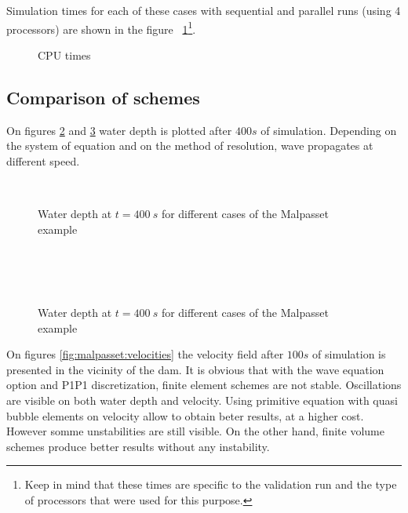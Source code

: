 Simulation times for each of these cases with sequential and parallel runs (using 4 processors) are shown in the figure ~\ref{fig:malpasset:cputime}\footnote{Keep in mind that these times
are specific to the validation run and the type of processors that were used for this purpose.}.

\begin{figure}[h!]
  \centering
  \caption{CPU times}\label{fig:malpasset:cputime}
\end{figure}

\subsection{Comparison of schemes}

On figures \ref{fig:malpasset:WD_all1} and \ref{fig:malpasset:WD_all2} water depth is plotted after $400s$ of simulation.
Depending on the system of equation and on the method of resolution, wave propagates at different speed.

\begin{figure}[H]
  \centering
  \\
  \caption{Water depth at $t=400~s$ for different cases of the Malpasset example}\label{fig:malpasset:WD_all1}
\end{figure}

\begin{figure}[H]
  \centering
  \\
  \\
  \\
  \caption{Water depth at $t=400~s$ for different cases of the Malpasset example}\label{fig:malpasset:WD_all2}
\end{figure}

On figures \ref{fig:malpasset:velocities} the velocity field after $100s$ of simulation is presented 
in the vicinity of the dam. It is obvious that with the wave equation option and P1P1 discretization, 
finite element schemes are not stable. Oscillations are visible on both water depth and velocity.
Using primitive equation with quasi bubble elements on velocity allow to obtain beter results, at a higher cost.
However somme unstabilities are still visible. On the other hand, finite volume schemes produce better results without any instability.

